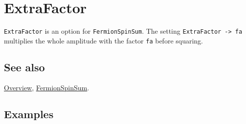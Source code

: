 \documentclass[../FeynCalcManual.tex]{subfiles}
\begin{document}
\hypertarget{extrafactor}{
\section{ExtraFactor}\label{extrafactor}}

\texttt{ExtraFactor} is an option for \texttt{FermionSpinSum}. The
setting \texttt{ExtraFactor -> fa} multiplies the whole amplitude with
the factor \texttt{fa} before squaring.

\subsection{See also}

\hyperlink{toc}{Overview}, \hyperlink{fermionspinsum}{FermionSpinSum}.

\subsection{Examples}
\end{document}
